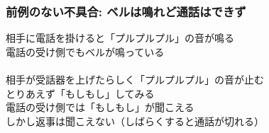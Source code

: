 \documentclass[
  lualatex,
  aspectratio=169,
  14pt
]{beamer}
\begin{document}
\begin{frame}
  \frametitle{前例のない不具合: ベルは鳴れど通話はできず}

  相手に電話を掛けると「プルプルプル」の音が鳴る\\
  \hspace{1.5\zw}電話の受け側でもベルが鳴っている
  \\~\\[-.5\baselineskip]

  相手が受話器を上げたらしく「プルプルプル」の音が止む\\
  \hspace{1.5\zw}とりあえず「もしもし」してみる\\
  \hspace{1.5\zw}電話の受け側では「もしもし」が聞こえる\\
  \hspace{1.5\zw}しかし返事は聞こえない（しばらくすると通話が切れる）

  \note{ }
\end{frame}
\end{document}
